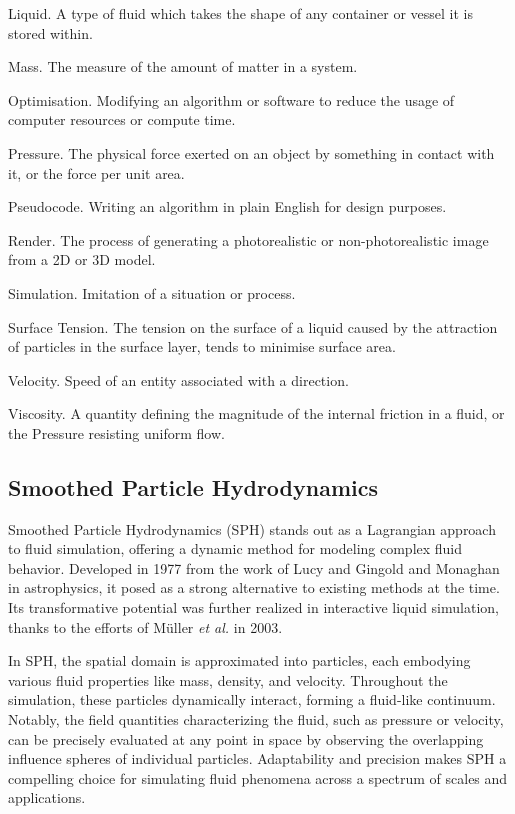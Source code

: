 \documentclass[write-up.tex]{subfiles}
\begin{document}
\begin{worddefs}
\item [Liquid.] A type of fluid which takes the shape of any container or vessel it is stored within.
\item[Mass.] The measure of the amount of matter in a system.
\item [Optimisation.] Modifying an algorithm or software to reduce the usage of computer resources or compute time.
\item[Pressure.] The physical force exerted on an object by something in contact with it, or the force per unit area.
\item [Pseudocode.] Writing an algorithm in plain English for design purposes.
\item[Render.] The process of generating a photorealistic or non-photorealistic image from a 2D or 3D model.
 \item [Simulation.] Imitation of a situation or process.
\item[Surface Tension.] The tension on the surface of a liquid caused by the attraction of particles in the surface layer, tends to minimise surface area.
 \item[Velocity.] Speed of an entity associated with a direction.
 \item[Viscosity.] A quantity defining the magnitude of the internal friction in a fluid, or the Pressure resisting uniform flow.
\end{worddefs}

\subsection{Smoothed Particle Hydrodynamics}
Smoothed Particle Hydrodynamics (SPH) stands out as a Lagrangian approach to fluid simulation, offering a dynamic method for modeling complex fluid behavior. Developed in 1977 from the work of Lucy \cite{lucy} and Gingold and Monaghan \cite{gingold} in astrophysics, it posed as a strong alternative to existing methods at the time. Its transformative potential was further realized in interactive liquid simulation, thanks to the efforts of Müller \textit{et al.} \cite{muller} in 2003.

In SPH, the spatial domain is approximated into particles, each embodying various fluid properties like mass, density, and velocity. Throughout the simulation, these particles dynamically interact, forming a fluid-like continuum. Notably, the field quantities characterizing the fluid, such as pressure or velocity, can be precisely evaluated at any point in space by observing the overlapping influence spheres of individual particles. Adaptability and precision makes SPH a compelling choice for simulating fluid phenomena across a spectrum of scales and applications.
\end{document}
